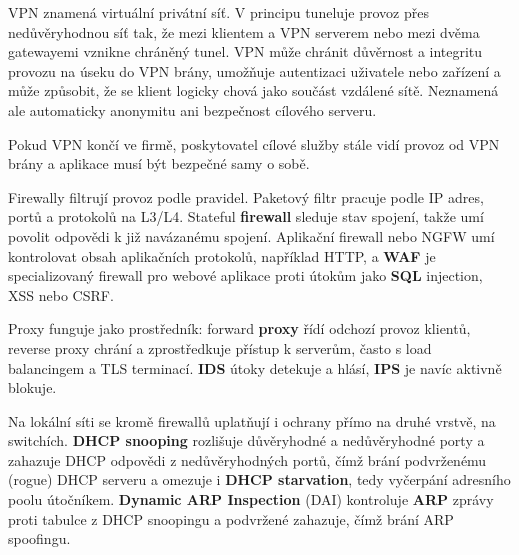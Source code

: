 
VPN znamená virtuální privátní síť. V principu tuneluje provoz přes nedůvěryhodnou síť tak, že mezi klientem a VPN serverem nebo mezi dvěma gatewayemi vznikne chráněný tunel. VPN může chránit důvěrnost a integritu provozu na úseku do VPN brány, umožňuje autentizaci uživatele nebo zařízení a může způsobit, že se klient logicky chová jako součást vzdálené sítě. Neznamená ale automaticky anonymitu ani bezpečnost cílového serveru.

Pokud VPN končí ve firmě, poskytovatel cílové služby stále vidí provoz od VPN brány a aplikace musí být bezpečné samy o sobě.

Firewally filtrují provoz podle pravidel. Paketový filtr pracuje podle IP adres, portů a protokolů na L3/L4. Stateful \textbf{firewall} sleduje stav spojení, takže umí povolit odpovědi k již navázanému spojení. Aplikační firewall nebo NGFW umí kontrolovat obsah aplikačních protokolů, například HTTP, a \textbf{WAF} je specializovaný firewall pro webové aplikace proti útokům jako \textbf{SQL} injection, XSS nebo CSRF.

Proxy funguje jako prostředník: forward \textbf{proxy} řídí odchozí provoz klientů, reverse proxy chrání a zprostředkuje přístup k serverům, často s load balancingem a TLS terminací. \textbf{IDS} útoky detekuje a hlásí, \textbf{IPS} je navíc aktivně blokuje.

Na lokální síti se kromě firewallů uplatňují i ochrany přímo na druhé vrstvě, na switchích. \textbf{DHCP snooping} rozlišuje důvěryhodné a nedůvěryhodné porty a zahazuje DHCP odpovědi z nedůvěryhodných portů, čímž brání podvrženému (rogue) DHCP serveru a omezuje i \textbf{DHCP starvation}, tedy vyčerpání adresního poolu útočníkem. \textbf{Dynamic ARP Inspection} (DAI) kontroluje \textbf{ARP} zprávy proti tabulce z DHCP snoopingu a podvržené zahazuje, čímž brání ARP spoofingu.

